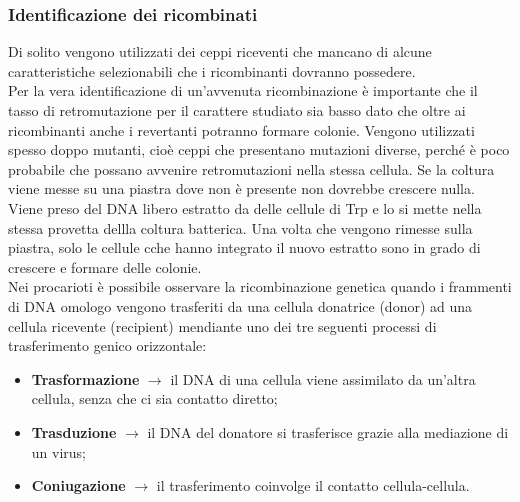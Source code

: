 \subsubsection{Identificazione dei ricombinati}
Di solito vengono utilizzati dei ceppi riceventi che mancano di alcune caratteristiche selezionabili che i ricombinanti dovranno possedere. 
\\Per la vera identificazione di un'avvenuta ricombinazione è importante che il tasso di retromutazione per il carattere studiato sia basso dato che oltre ai ricombinanti anche i revertanti potranno formare colonie. Vengono utilizzati spesso doppo mutanti, cioè ceppi che presentano mutazioni diverse, perché è poco probabile che possano avvenire retromutazioni nella stessa cellula. Se la coltura viene messe su una piastra  dove non è presente non dovrebbe crescere nulla. 
\\Viene preso del DNA libero estratto da delle cellule di Trp\ap{+} e lo si mette nella stessa provetta dellla coltura batterica. Una volta che vengono rimesse sulla piastra, solo le cellule cche hanno integrato il nuovo estratto sono in grado di crescere e formare delle colonie.
\\Nei procarioti è possibile osservare la ricombinazione genetica quando i frammenti di DNA omologo vengono trasferiti da una cellula donatrice (donor) ad una cellula ricevente (recipient) mendiante uno dei tre seguenti processi di trasferimento genico orizzontale:
\begin{itemize}
    \item \textbf{Trasformazione} $\xrightarrow{}$ il DNA di una cellula viene assimilato da un'altra cellula, senza che ci sia contatto diretto; 
    \item \textbf{Trasduzione} $\xrightarrow{}$ il DNA del donatore si trasferisce grazie alla mediazione di un virus;
    \item \textbf{Coniugazione} $\xrightarrow{}$ il trasferimento coinvolge il contatto cellula-cellula.
\end{itemize}
